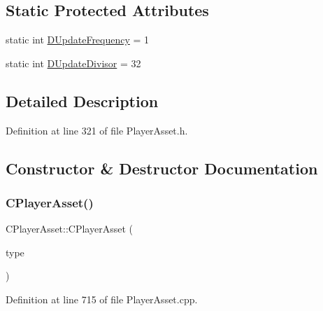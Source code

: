 \subsection*{Static Protected Attributes}
\begin{DoxyCompactItemize}
\item 
static int \hyperlink{classCPlayerAsset_ade2147d67ec25b0280d5f11a89dd0dc5}{D\+Update\+Frequency} = 1
\item 
static int \hyperlink{classCPlayerAsset_a09d17faf2ad70e2f778095a3c314d398}{D\+Update\+Divisor} = 32
\end{DoxyCompactItemize}


\subsection{Detailed Description}


Definition at line 321 of file Player\+Asset.\+h.



\subsection{Constructor \& Destructor Documentation}
\hypertarget{classCPlayerAsset_a84787ab2502e70d52c5b73b51ba9063a}{}\label{classCPlayerAsset_a84787ab2502e70d52c5b73b51ba9063a} 
\subsubsection{\texorpdfstring{C\+Player\+Asset()}{CPlayerAsset()}}
{\footnotesize\ttfamily C\+Player\+Asset\+::\+C\+Player\+Asset (\begin{DoxyParamCaption}\item[{std\+::shared\+\_\+ptr$<$ \hyperlink{classCPlayerAssetType}{C\+Player\+Asset\+Type} $>$}]{type }\end{DoxyParamCaption})}



Definition at line 715 of file Player\+Asset.\+cpp.


